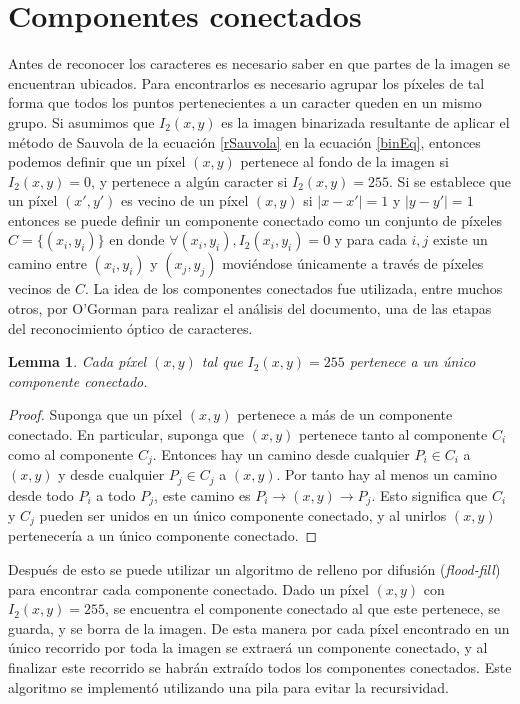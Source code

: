 \documentclass[a4paper, 11pt, oneside]{report}
\begin{document}
\section{Componentes conectados}
\label{sect:conComponents}

Antes de reconocer los caracteres es necesario saber en que partes de la imagen se encuentran ubicados. Para encontrarlos es necesario agrupar los píxeles de tal forma que todos los puntos pertenecientes a un caracter queden en un mismo grupo. Si asumimos que $I_2(x,y)$ es la imagen binarizada resultante de aplicar el método de Sauvola de la ecuación \eqref{rSauvola} en la ecuación \eqref{binEq}, entonces podemos definir que un píxel $(x,y)$ pertenece al fondo de la imagen si $I_2(x,y)=0$, y pertenece a algún caracter si $I_2(x,y)=255$. Si se establece que un píxel $(x',y')$ es vecino de un píxel $(x,y)$ si $|x-x'|=1$ y $|y-y'|=1$ entonces se puede definir un componente conectado como un conjunto de píxeles $C=\{(x_i,y_i)\}$ en donde $\forall{(x_i,y_i)}, I_2(x_i,y_i)=0$ y para cada $i,j$ existe un camino entre $(x_i,y_i)$ y $(x_j,y_j)$ moviéndose únicamente a través de píxeles vecinos de $C$. La idea de los componentes conectados fue utilizada, entre muchos otros, por O'Gorman\cite{docstrum93} para realizar el análisis del documento, una de las etapas del reconocimiento óptico de caracteres.

\newtheorem{pixHasOneC}{Lemma}
\begin{pixHasOneC}
	Cada píxel $(x,y)$ tal que $I_2(x,y)=255$ pertenece a un único componente conectado.
\end{pixHasOneC}
\begin{proof}
	Suponga que un píxel $(x,y)$ pertenece a más de un componente conectado. En particular, suponga que $(x,y)$ pertenece tanto al componente $C_i$ como al componente $C_j$. Entonces hay un camino desde cualquier $P_i \in C_i$ a $(x,y)$ y desde cualquier $P_j \in C_j$ a $(x,y)$. Por tanto hay al menos un camino desde todo $P_i$ a todo $P_j$, este camino es $P_i \rightarrow (x,y) \rightarrow P_j$. Esto significa que $C_i$ y $C_j$ pueden ser unidos en un único componente conectado, y al unirlos $(x,y)$ pertenecería a un único componente conectado.
\end{proof}

Después de esto se puede utilizar un algoritmo de relleno por difusión ({\em flood-fill}) para encontrar cada componente conectado. Dado un píxel $(x,y)$ con $I_2(x,y)=255$, se encuentra el componente conectado al que este pertenece, se guarda, y se borra de la imagen. De esta manera por cada píxel encontrado en un único recorrido por toda la imagen se extraerá un componente conectado, y al finalizar este recorrido se habrán extraído todos los componentes conectados. Este algoritmo se implementó utilizando una pila para evitar la recursividad.
\end{document}
